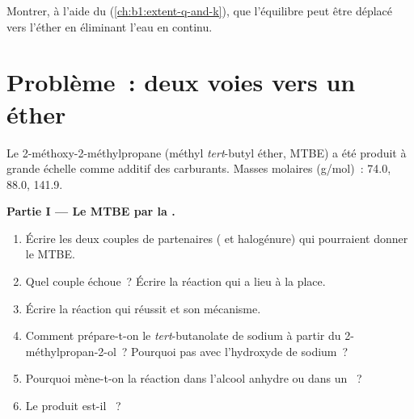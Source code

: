\begin{exercise}[$\star\star\star$]\label{exo:b1:alcohol-activation:12}
Montrer, à l'aide du  (\cref{ch:b1:extent-q-and-k}),
que l'équilibre  peut être déplacé
vers l'éther en éliminant l'eau en continu.
\end{exercise}

\section{Problème~: deux voies vers un éther}

\begin{problem}
\label{pb:b1:alcohol-activation:1}
Le 2-méthoxy-2-méthylpropane (méthyl \textit{tert}-butyl éther, MTBE) a
été produit à grande échelle comme additif des carburants. Masses
molaires (\unit{g/mol})~: 
74.0,  88.0,  141.9.

\medskip
\noindent\textbf{Partie I --- Le MTBE par la .}
\begin{enumerate}
  \item Écrire les deux couples de partenaires ( et halogénure)
        qui pourraient donner le MTBE.
  \item Quel couple échoue~? Écrire la réaction qui a lieu à la place.
  \item Écrire la réaction qui réussit et son mécanisme.
  \item Comment prépare-t-on le \textit{tert}-butanolate de sodium à
        partir du 2-méthylpropan-2-ol~? Pourquoi pas avec l'hydroxyde de
        sodium~?
  \item Pourquoi mène-t-on la réaction dans l'alcool anhydre ou dans un
        ~?
  \item Le produit est-il ~?
\end{enumerate}


\end{problem}
